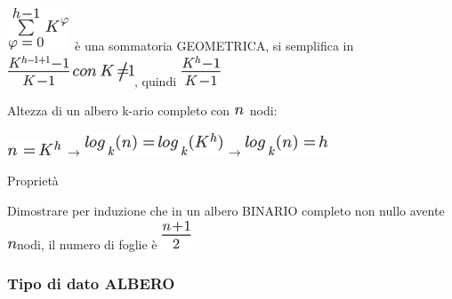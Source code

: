 \documentclass{article}
\begin{document}
{}

\includegraphics{images/image93.png}{~è una sommatoria GEOMETRICA, si
semplifica in }\includegraphics{images/image94.png}{, quindi
}\includegraphics{images/image95.png}

{}

{Altezza di un albero k-ario completo con
}\includegraphics{images/image41.png}{~nodi:}

\includegraphics{images/image96.png}{~→
}\includegraphics{images/image97.png}{~→
}\includegraphics{images/image98.png}

{}

{}

{Proprietà}

{Dimostrare per induzione che in un albero BINARIO completo non nullo
avente }\includegraphics{images/image41.png}{nodi, il numero di foglie è
}\includegraphics{images/image99.png}

{}

{}

{}

{}

{}

{}

\hypertarget{h.8kg49eb4dpz1}{\subsubsection{\texorpdfstring{{Tipo di
dato ALBERO}}{Tipo di dato ALBERO}}\label{h.8kg49eb4dpz1}}
\end{document}
